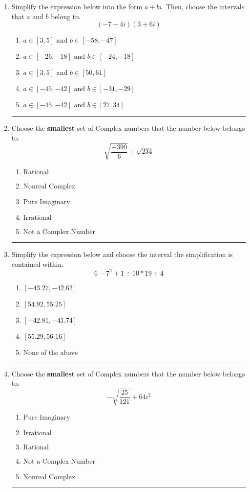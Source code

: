 \documentclass[14pt]{extbook}
\newcommand{\litem}[1]{\item#1\hspace*{-1cm}\rule{\textwidth}{0.4pt}}
\begin{document}
\begin{enumerate}
\litem{
Simplify the expression below into the form $a+bi$. Then, choose the intervals that $a$ and $b$ belong to.\[ (-7 - 4 i)(3 + 6 i) \]\begin{enumerate}[label=\Alph*.]
\item \( a \in [3, 5] \text{ and } b \in [-58, -47] \)
\item \( a \in [-26, -18] \text{ and } b \in [-24, -18] \)
\item \( a \in [3, 5] \text{ and } b \in [50, 61] \)
\item \( a \in [-45, -42] \text{ and } b \in [-31, -29] \)
\item \( a \in [-45, -42] \text{ and } b \in [27, 34] \)

\end{enumerate} }
\litem{
Choose the \textbf{smallest} set of Complex numbers that the number below belongs to.\[ \sqrt{\frac{-390}{6}}+\sqrt{234} \]\begin{enumerate}[label=\Alph*.]
\item \( \text{Rational} \)
\item \( \text{Nonreal Complex} \)
\item \( \text{Pure Imaginary} \)
\item \( \text{Irrational} \)
\item \( \text{Not a Complex Number} \)

\end{enumerate} }
\litem{
Simplify the expression below and choose the interval the simplification is contained within.\[ 6 - 7^2 + 1 \div 10 * 19 \div 4 \]\begin{enumerate}[label=\Alph*.]
\item \( [-43.27, -42.62] \)
\item \( [54.92, 55.25] \)
\item \( [-42.81, -41.74] \)
\item \( [55.29, 56.16] \)
\item \( \text{None of the above} \)

\end{enumerate} }
\litem{
Choose the \textbf{smallest} set of Complex numbers that the number below belongs to.\[ -\sqrt{\frac{25}{121}} + 64i^2 \]\begin{enumerate}[label=\Alph*.]
\item \( \text{Pure Imaginary} \)
\item \( \text{Irrational} \)
\item \( \text{Rational} \)
\item \( \text{Not a Complex Number} \)
\item \( \text{Nonreal Complex} \)


\end{enumerate}}
\end{enumerate}
\end{document}
